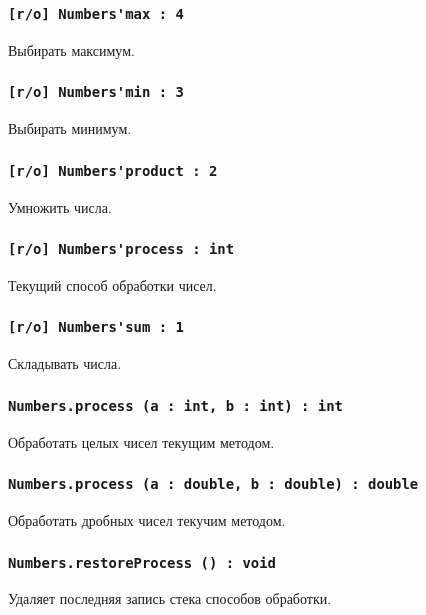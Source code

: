 \subsubsection{\lstinline|[r/o] Numbers'max : 4|}

Выбирать максимум.

\subsubsection{\lstinline|[r/o] Numbers'min : 3|}

Выбирать минимум.

\subsubsection{\lstinline|[r/o] Numbers'product : 2|}

Умножить числа.

\subsubsection{\lstinline|[r/o] Numbers'process : int|}

Текущий способ обработки чисел.

\subsubsection{\lstinline|[r/o] Numbers'sum : 1|}

Складывать числа.

\subsubsection{\lstinline|Numbers.process (a : int, b : int) : int|}

Обработать целых чисел текущим методом.

\subsubsection{\lstinline|Numbers.process (a : double, b : double) : double|}

Обработать дробных чисел текучим методом.

\subsubsection{\lstinline|Numbers.restoreProcess () : void|}

Удаляет последняя запись стека способов обработки.

